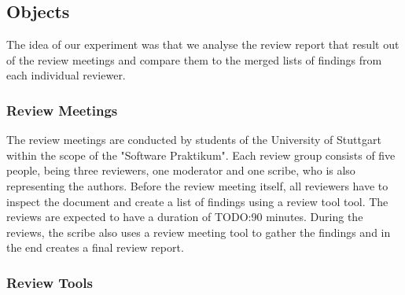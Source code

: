 \subsection{Objects}

The idea of our experiment was that we analyse the review report that result out of the review meetings and compare them to the merged lists of findings from each individual reviewer.

\subsubsection{Review Meetings}

The review meetings are conducted by students of the University of Stuttgart within the scope of the "Software Praktikum". Each review group consists of five people, being three reviewers, one moderator and one scribe, who is also representing the authors. Before the review meeting itself, all reviewers have to inspect the document and create a list of findings using a review tool \cite{TODO:revager Thommy} tool. The reviews are expected to have a duration of TODO:90 minutes. During the reviews, the scribe also uses a review meeting tool to gather the findings and in the end creates a final review report.

\subsubsection{Review Tools}

